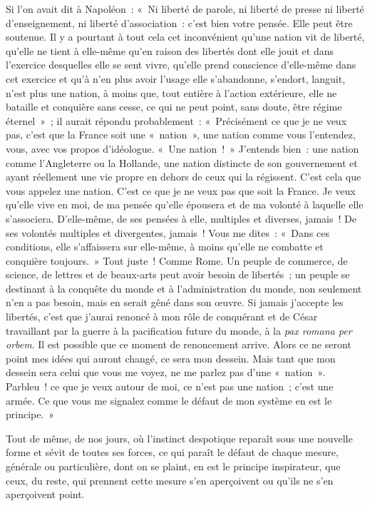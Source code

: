 \documentclass[french,twoside]{book} %
\begin{document}
Si l’on avait dit à Napoléon : « Ni liberté de parole, ni liberté de presse ni liberté d’enseignement, ni liberté d’association : c’est bien votre pensée. Elle peut être soutenue. Il y a pourtant à tout cela cet inconvénient qu’une nation vit de liberté, qu’elle ne tient à elle-même qu’en raison des libertés dont elle jouit et dans l’exercice desquelles elle se sent vivre, qu’elle prend conscience d’elle-même dans cet exercice et qu’à n’en plus avoir l’usage elle s’abandonne, s’endort, languit, n’est plus une nation, à moins que, tout entière à l’action extérieure, elle ne bataille et conquière sans cesse, ce qui ne peut point, sans doute, être régime éternel » ; il aurait répondu probablement : « Précisément ce que je ne veux pas, c’est que la France soit une « nation », une nation comme vous l’entendez,  vous, avec vos propos d’idéologue. « Une nation ! » J’entends bien : une nation comme l’Angleterre ou la Hollande, une nation distincte de son gouvernement et ayant réellement une vie propre en dehors de ceux qui la régissent. C’est cela que vous appelez une nation. C’est ce que je ne veux pas que soit la France. Je veux qu’elle vive en moi, de ma pensée qu’elle épousera et de ma volonté à laquelle elle s’associera. D’elle-même, de ses pensées à elle, multiples et diverses, jamais ! De ses volontés multiples et divergentes, jamais ! Vous me dites : « Dans ces conditions, elle s’affaissera sur elle-même, à moins qu’elle ne combatte et conquière toujours. » Tout juste ! Comme Rome. Un peuple de commerce, de science, de lettres et de beaux-arts peut avoir besoin de libertés ; un peuple se destinant à la conquête du monde et à l’administration du monde, non seulement n’en a pas besoin, mais en serait gêné dans son œuvre. Si jamais j’accepte les libertés, c’est que j’aurai renoncé à mon rôle de conquérant et de César travaillant par la guerre à la pacification future du monde, à la {\itshape pax romana per orbem}. Il est possible que ce moment de renoncement arrive. Alors ce ne seront point mes idées qui auront changé, ce sera mon dessein. Mais tant que mon dessein sera celui que vous me voyez, ne me parlez pas d’une « nation ». Parbleu ! ce que je veux  autour de moi, ce n’est pas une nation ; c’est une armée. Ce que vous me signalez comme le défaut de mon système en est le principe. »\par
Tout de même, de nos jours, où l’instinct despotique reparaît sous une nouvelle forme et sévit de toutes ses forces, ce qui paraît le défaut de chaque mesure, générale ou particulière, dont on se plaint, en est le principe inspirateur, que ceux, du reste, qui prennent cette mesure s’en aperçoivent ou qu’ils ne s’en aperçoivent point.\par
\end{document}
